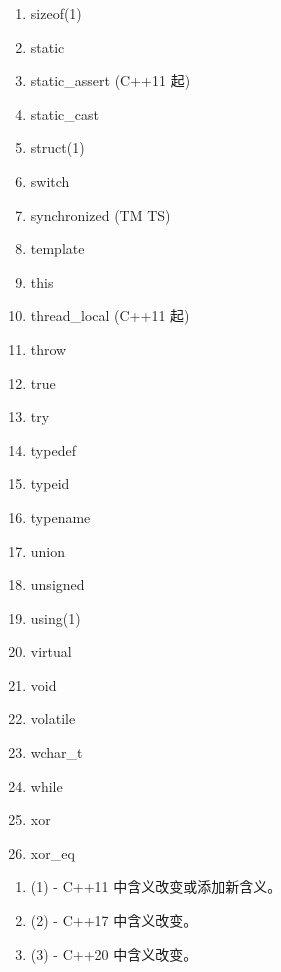 \begin{appendices}
\begin{multicols}{2}
\begin{enumerate}
        \item sizeof(1)
        \item static
        \item static\_assert (C++11 起)
        \item static\_cast
        \item struct(1)
        \item switch
        \item synchronized (TM TS)
        \item template
        \item this
        \item thread\_local (C++11 起)
        \item throw
        \item true
        \item try
        \item typedef
        \item typeid
        \item typename
        \item union
        \item unsigned
        \item using(1)
        \item virtual
        \item void
        \item volatile
        \item wchar\_t
        \item while
        \item xor
        \item xor\_eq
    \end{enumerate}
    
\end{multicols}
    
    \begin{enumerate}
        \item (1) - C++11 中含义改变或添加新含义。
        \item (2) - C++17 中含义改变。
        \item (3) - C++20 中含义改变。
    \end{enumerate}
    
    
\end{appendices}